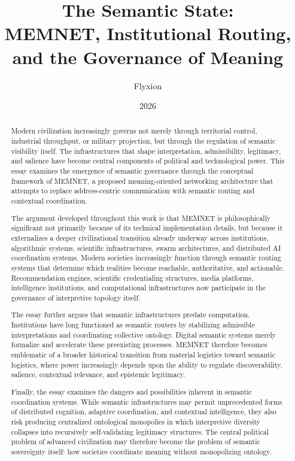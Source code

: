 \documentclass[11pt,a4paper]{article}
\title{
The Semantic State:\\
MEMNET, Institutional Routing, and the Governance of Meaning
}
\author{
Flyxion
}
\date{2026}
\begin{document}
\maketitle

\begin{abstract}

Modern civilization increasingly governs not merely through territorial control, industrial throughput, or military projection, but through the regulation of semantic visibility itself. The infrastructures that shape interpretation, admissibility, legitimacy, and salience have become central components of political and technological power. This essay examines the emergence of semantic governance through the conceptual framework of MEMNET, a proposed meaning-oriented networking architecture that attempts to replace address-centric communication with semantic routing and contextual coordination.

The argument developed throughout this work is that MEMNET is philosophically significant not primarily because of its technical implementation details, but because it externalizes a deeper civilizational transition already underway across institutions, algorithmic systems, scientific infrastructures, swarm architectures, and distributed AI coordination systems. Modern societies increasingly function through semantic routing systems that determine which realities become reachable, authoritative, and actionable. Recommendation engines, scientific credentialing structures, media platforms, intelligence institutions, and computational infrastructures now participate in the governance of interpretive topology itself.

The essay further argues that semantic infrastructures predate computation. Institutions have long functioned as semantic routers by stabilizing admissible interpretations and coordinating collective ontology. Digital semantic systems merely formalize and accelerate these preexisting processes. MEMNET therefore becomes emblematic of a broader historical transition from material logistics toward semantic logistics, where power increasingly depends upon the ability to regulate discoverability, salience, contextual relevance, and epistemic legitimacy.

Finally, the essay examines the dangers and possibilities inherent in semantic coordination systems. While semantic infrastructures may permit unprecedented forms of distributed cognition, adaptive coordination, and contextual intelligence, they also risk producing centralized ontological monopolies in which interpretive diversity collapses into recursively self-validating legitimacy structures. The central political problem of advanced civilization may therefore become the problem of semantic sovereignty itself: how societies coordinate meaning without monopolizing ontology.

\end{abstract}
\end{document}
